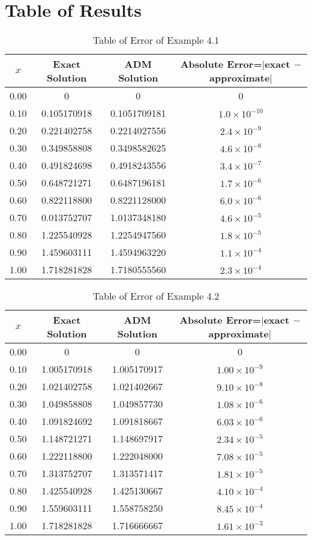 \documentclass[11pt]{report}
\begin{document}
	\section{Table of Results}
	\begin{table}[!h]
		\caption{Table of Error of Example 4.1}\label{tab:4_1}
		\centering
		\begin{tabular}{|c|c|c|c|}
			\hline
			$x$ & Exact Solution & ADM Solution & Absolute Error=$|$exact $-$ approximate$|$\\\hline
			0.00 & 0 & 0& 0\\
			0.10 & 0.105170918 & 0.1051709181 & $1.0\times 10^{-10}$\\
			0.20 & 0.221402758 & 0.2214027556 & $2.4\times 10^{-9}$\\
			0.30 & 0.349858808 & 0.3498582625 & $4.6\times 10^{-8}$\\
			0.40 & 0.491824698 & 0.4918243556 & $3.4\times 10^{-7}$\\
			0.50 & 0.648721271 & 0.6487196181 & $1.7\times 10^{-6}$\\
			0.60 & 0.822118800 & 0.8221128000 & $6.0\times 10^{-6}$\\
			0.70 & 0.013752707 & 1.0137348180 & $4.6\times 10^{-5}$\\
			0.80 & 1.225540928 & 1.2254947560 & $1.8\times 10^{-5}$\\
			0.90 & 1.459603111 & 1.4594963220 & $1.1\times 10^{-4}$\\
			1.00 & 1.718281828 & 1.7180555560 & $2.3\times 10^{-4}$\\\hline
		\end{tabular}
	\end{table}

	\newpage
	\begin{table}[!h]
		\centering
		\caption{Table of Error of Example 4.2}\label{tab:4_2}
		\begin{tabular}{|c|c|c|c|}
			\hline
			$x$ & Exact Solution & ADM Solution & Absolute Error=$|$exact $-$ approximate$|$\\\hline
			0.00 & 0 & 0 & 0\\
			0.10 & 1.005170918 & 1.005170917 & $1.00\times10^{-9}$\\
			0.20 & 1.021402758 & 1.021402667 & $9.10\times10^{-8}$\\
			0.30 & 1.049858808 & 1.049857730 & $1.08\times10^{-6}$\\
			0.40 & 1.091824692 & 1.091818667 & $6.03\times10^{-6}$\\
			0.50 & 1.148721271 & 1.148697917 & $2.34\times10^{-5}$\\
			0.60 & 1.222118800 & 1.222048000 & $7.08\times10^{-5}$\\
			0.70 & 1.313752707 & 1.313571417 & $1.81\times10^{-5}$\\
			0.80 & 1.425540928 & 1.425130667 & $4.10\times10^{-4}$\\
			0.90 & 1.559603111 & 1.558758250 & $8.45\times10^{-4}$\\
			1.00 & 1.718281828 & 1.716666667 & $1.61\times10^{-3}$\\\hline
		\end{tabular}
	\end{table}
	
\end{document}
